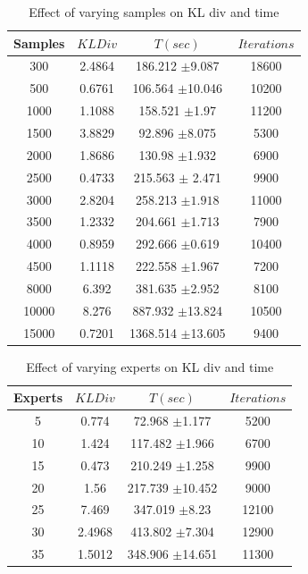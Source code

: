 \documentclass{sig-alternate}
\begin{document}
\begin{table}[htdp]
\begin{center}
\begin{tabular}{| c | c | c | c |}
\hline
Samples & $KL Div$ & $T(sec)$ & $Iterations$ \\
\hline
300 & 2.4864 & 186.212 $\pm$9.087 & 18600 \\
500 & 0.6761 & 106.564 $\pm$10.046 & 10200 \\
1000 & 1.1088 & 158.521 $\pm$1.97  & 11200 \\
1500 & 3.8829 & 92.896 $\pm$8.075  & 5300 \\
2000 & 1.8686 & 130.98 $\pm$1.932 & 6900 \\
2500 & 0.4733 & 215.563 $\pm$ 2.471 & 9900 \\
3000 & 2.8204 & 258.213 $\pm1.918$ & 11000 \\
3500 & 1.2332 & 204.661 $\pm$1.713 & 7900 \\
4000 & 0.8959 & 292.666 $\pm$0.619 & 10400  \\
4500 & 1.1118 & 222.558 $\pm$1.967 & 7200  \\
8000 & 6.392 & 381.635 $\pm$2.952 & 8100  \\
10000 & 8.276 & 887.932 $\pm$13.824 & 10500  \\
15000 & 0.7201 & 1368.514 $\pm$13.605 & 9400  \\
\hline
\end{tabular}
\end{center}
\caption{Effect of varying samples on KL div and time}
\label{table: error1}
\end{table}

\begin{table}[htdp]
\begin{center}
\begin{tabular}{| c | c | c | c |}
\hline
Experts & $KL Div$ & $T(sec)$ & $Iterations$ \\
\hline
5 & 0.774 & 72.968 $\pm$1.177 & 5200 \\
10 & 1.424 & 117.482 $\pm$1.966 & 6700 \\
15 & 0.473 & 210.249 $\pm$1.258  & 9900 \\
20 & 1.56 & 217.739 $\pm$10.452 & 9000 \\
25 & 7.469 & 347.019 $\pm$8.23 & 12100 \\
30 & 2.4968 & 413.802 $\pm$7.304 & 12900 \\
35 & 1.5012 & 348.906 $\pm$14.651 & 11300 \\
\hline
\end{tabular}
\end{center}
\caption{Effect of varying experts on KL div and time}
\label{table: error2}
\end{table}
\end{document}
